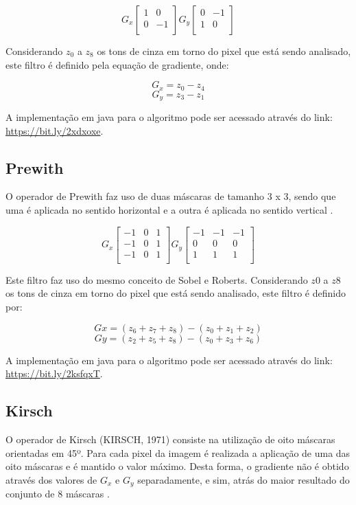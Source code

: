 \documentclass[
	12pt,				%
	oneside,			%
	a4paper,			%
	english,			%
	french,				%
	spanish,			%
	brazil,				%
	]{abntex2}
\begin{document}
\[
G_x
\begin{bmatrix}
    1 &  0    \\ 
	0 & -1    \\    
\end{bmatrix} 
G_y
\begin{bmatrix}
    0 & -1   \\ 
	1 &  0   \\    
\end{bmatrix} 
\]

Considerando \(z_0\) a \(z_8\) os tons de cinza em torno do pixel que está sendo analisado, este filtro é definido pela equação de gradiente, onde:

\[G_x = z_0 - z_4\]
\[G_y = z_3 -z_1\]

A implementação em java para o algoritmo pode ser acessado através do link: \url{https://bit.ly/2xdxoxe}.
\subsection{Prewith}

O operador de Prewith faz uso de duas máscaras de tamanho 3 x 3, sendo que uma é aplicada no sentido horizontal e a outra é aplicada no sentido vertical \cite{pedriniSchwartz:2008}.	

\[
G_x
\begin{bmatrix}
    -1 & 0 & 1   \\ 
	-1 & 0 & 1   \\ 
	-1 & 0 & 1   \\    
\end{bmatrix} 
G_y
\begin{bmatrix}
    -1 & -1 & -1   \\ 
	 0 &  0 &  0   \\ 
	 1 &  1 &  1   \\    
\end{bmatrix} 
\]

Este filtro faz uso do mesmo conceito de Sobel e Roberts. Considerando \(z0\) a \(z8\) os tons de cinza em torno do pixel que está sendo analisado, este filtro é definido por:

\[Gx = (z_6 + z_7 + z_8) - (z_0 + z_1 + z_2)\]
\[Gy = (z_2 + z_5 + z_8) - (z_0 + z_3 + z_6)\]

A implementação em java para o algoritmo pode ser acessado através do link: \url{https://bit.ly/2ksfqxT}. 

\subsection{Kirsch}
O operador de Kirsch (KIRSCH, 1971) consiste na utilização de oito máscaras orientadas em 45º. Para cada pixel da imagem é realizada a aplicação de uma das oito máscaras e é mantido o valor máximo. Desta forma, o gradiente não é obtido através dos valores de \(G_x\) e \(G_y\) separadamente, e sim, atrás do maior resultado do conjunto de 8 máscaras \cite{pedriniSchwartz:2008}.
\end{document}
